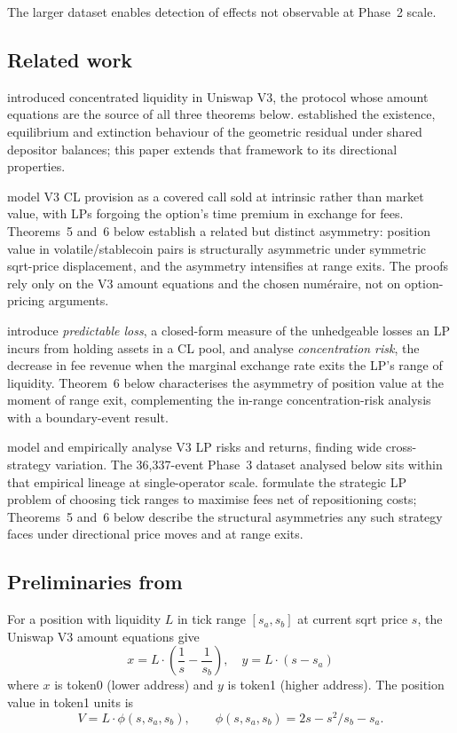 \documentclass[11pt,a4paper]{article}
\theoremstyle{definition}
\begin{document}
\noindent The larger dataset enables detection of effects not observable at Phase~2 scale.

\subsection{Related work}\label{sec:related}

\citet{adams2021} introduced concentrated liquidity in Uniswap V3, the protocol whose amount equations are the source of all three theorems below. \citet{ryan2026a} established the existence, equilibrium and extinction behaviour of the geometric residual under shared depositor balances; this paper extends that framework to its directional properties.

\citet{hasbrouck2025} model V3 CL provision as a covered call sold at intrinsic rather than market value, with LPs forgoing the option's time premium in exchange for fees. Theorems~5 and~6 below establish a related but distinct asymmetry: position value in volatile/stablecoin pairs is structurally asymmetric under symmetric sqrt-price displacement, and the asymmetry intensifies at range exits. The proofs rely only on the V3 amount equations and the chosen num\'eraire, not on option-pricing arguments.

\citet{cartea2024} introduce \emph{predictable loss}, a closed-form measure of the unhedgeable losses an LP incurs from holding assets in a CL pool, and analyse \emph{concentration risk}, the decrease in fee revenue when the marginal exchange rate exits the LP's range of liquidity. Theorem~6 below characterises the asymmetry of position value at the moment of range exit, complementing the in-range concentration-risk analysis with a boundary-event result.

\citet{heimbach2022} model and empirically analyse V3 LP risks and returns, finding wide cross-strategy variation. The 36{,}337-event Phase~3 dataset analysed below sits within that empirical lineage at single-operator scale. \citet{fan2023} formulate the strategic LP problem of choosing tick ranges to maximise fees net of repositioning costs; Theorems~5 and~6 below describe the structural asymmetries any such strategy faces under directional price moves and at range exits.

\subsection{Preliminaries from \citet{ryan2026a}}

For a position with liquidity $L$ in tick range $[s_a, s_b]$ at current sqrt price $s$, the Uniswap V3 amount equations give
\begin{equation}\label{eq:amounts-prelim}
x = L \cdot \left(\frac{1}{s} - \frac{1}{s_b}\right), \quad y = L \cdot (s - s_a)
\end{equation}
where $x$ is token0 (lower address) and $y$ is token1 (higher address). The position value in token1 units is
\begin{equation}\label{eq:value-prelim}
V = L \cdot \phi(s, s_a, s_b), \qquad \phi(s, s_a, s_b) = 2s - s^2/s_b - s_a.
\end{equation}
\end{document}
